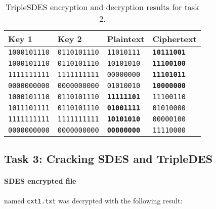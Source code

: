 \documentclass[a4paper,english,12pt]{article}
\begin{document}
\begin{table}
  \centering
  \begin{tabular}{@{}llll@{}}
    \toprule
      Key 1 &
      Key 2 &
      Plaintext &
      Ciphertext \\
    \midrule

             \texttt{1000101110} &
             \texttt{0110101110} &
               \texttt{11010111} &
       \texttt{\textbf{10111001}} \\

            \texttt{1000101110} &
            \texttt{0110101110} &
              \texttt{10101010} &
      \texttt{\textbf{11100100}} \\

            \texttt{1111111111} &
            \texttt{1111111111} &
              \texttt{00000000} &
      \texttt{\textbf{11101011}} \\

            \texttt{0000000000} &
            \texttt{0000000000} &
              \texttt{01010010} &
      \texttt{\textbf{10000000}} \\

            \texttt{1000101110} &
            \texttt{0110101110} &
      \texttt{\textbf{11111101}} &
              \texttt{11100110} \\

             \texttt{1011101111} &
             \texttt{0110101110} &
       \texttt{\textbf{01001111}} &
               \texttt{01010000} \\

            \texttt{1111111111} &
            \texttt{1111111111} &
      \texttt{\textbf{10101010}} &
              \texttt{00000100} \\

            \texttt{0000000000} &
            \texttt{0000000000} &
      \texttt{\textbf{00000000}} &
              \texttt{11110000} \\
      \bottomrule
  \end{tabular}
  \caption{TripleSDES encryption and decryption results for task 2.}
  \label{table:task2}
\end{table}

\subsection{Task 3: Cracking SDES and TripleDES}

\paragraph{SDES encrypted file} named \texttt{cxt1.txt} was decrypted with the
following result:
\end{document}
